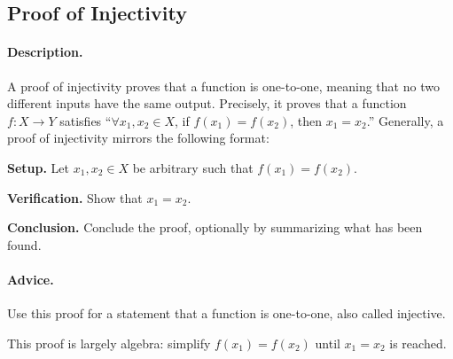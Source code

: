 \subsection{Proof of Injectivity}
\label{subsections:techniques:universal:injective}



\paragraph{Description.}
A proof of injectivity proves that a function is one-to-one, %
meaning that no two different inputs have the same output. %
Precisely, it proves that a function $f \colon X \to Y$ satisfies %
``$\forall x_1, x_2 \in X$, if $f(x_1) = f(x_2)$, then $x_1 = x_2$.'' %
Generally, a proof of injectivity mirrors the following format:
\begin{enumerate}{
    \item \textbf{Setup.} %
        Let $x_1, x_2 \in X$ be arbitrary such that $f(x_1) = f(x_2)$.
    \item \textbf{Verification.} %
        Show that $x_1 = x_2$.
    \item \textbf{Conclusion.} %
        Conclude the proof, optionally by summarizing what has been found.
}
\end{enumerate}



\paragraph{Advice.}
\begin{itemize}{
    \item Use this proof for a statement that a function is one-to-one, %
        also called injective.
    \item This proof is largely algebra: %
        simplify $f(x_1) = f(x_2)$ until $x_1 = x_2$ is reached.
}
\end{itemize}



